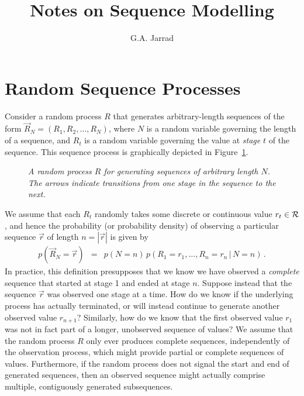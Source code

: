 \documentclass[a4paper]{article}
\title{Notes on Sequence Modelling}
\author{G.A. Jarrad}
\newcommand{\vr}{\vec{r}}
\begin{document}
\maketitle
{}
\section{Random Sequence Processes}
\label{sec:random-processes}
Consider a random process $R$ that generates arbitrary-length sequences
of the form $\vec{R}_N=(R_1,R_2,\ldots,R_N)$, where $N$ is a random variable governing
the length of a sequence, and $R_t$ is a random variable governing the value at {\em stage} $t$
of the sequence. This sequence process is graphically depicted in Figure~\ref{fig:R-process}.
\begin{figure}[hbt]
\centering
{}
\caption{\em A random process $R$ for generating sequences of arbitrary length $N$. The arrows indicate transitions from one stage in the sequence to the next.}
\label{fig:R-process}
\end{figure}

We assume that each $R_t$ randomly takes some discrete or continuous value $r_t\in{\cal R}$,
and hence the probability (or probability density) of observing a particular
sequence $\vr$ of length $n=|\vr|$ is given by
\begin{eqnarray}
   p(\vec{R}_N\!=\!\vr) & = & p(N=n)\,p(R_1\!=\!r_1,\ldots,R_n\!=\!r_n\,|\,N=n)\,.
\end{eqnarray}
In practice, this definition presupposes that we know we have observed a {\em complete} sequence that started
at stage 1 and ended at stage $n$.
Suppose instead that the sequence $\vr$ was observed one stage at a time. How do we know if the
underlying process has actually terminated, or will instead
continue to generate another observed value $r_{n+1}$? 
Similarly, how do we know that the first observed value $r_1$ was not in fact
part of a longer, unobserved sequence of values?
We assume that the random process $R$ only ever produces complete sequences,
independently of the observation process, which might provide partial or complete sequences of values.
Furthermore, if the random process does not signal the start and end of generated sequences,
then an observed sequence might actually comprise multiple, contiguously generated subsequences.
\end{document}
